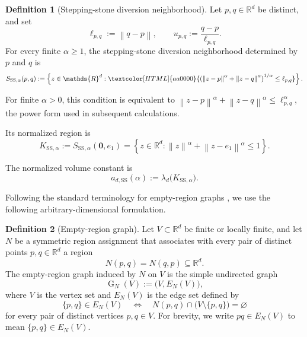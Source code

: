 \documentclass[a4paper,fleqn]{cas-dc}
\theoremstyle{definition}
\newtheorem{definition}{Definition}
\theoremstyle{remark}
\newcommand{\R}{\mathds{R}}
\newcommand{\norm}[1]{\left\lVert #1\right\rVert}
\newcommand{\set}[1]{\left\{#1\right\}}
\newcommand{\ellpq}{\ell_{p,q}}
\newcommand{\upq}{u_{p,q}}
\newcommand{\0}{\mathbf{0}}
\newcommand{\tr}[1]{\textcolor[HTML]{aa0000}{#1}}
\DeclareMathOperator{\G}{G}
\begin{document}
\begin{definition}[Stepping-stone diversion neighborhood]
Let $p,q\in\R^d$ be distinct, and set
\begin{equation}
    \ellpq:=\norm{q-p},
    \qquad
    \upq:=\frac{q-p}{\ellpq}.
\end{equation}
\tr{For every finite $\alpha\geq1$,} the stepping-stone diversion
neighborhood determined by $p$ and $q$ is
\begin{equation}\label{eq:ss-region}
    S_{\mathrm{SS},\alpha}(p,q)
    :=
    \set{
        z\in\R^d:
        \tr{\left(
        \norm{z-p}^{\alpha}+\norm{z-q}^{\alpha}
        \right)^{1/\alpha}\leq\ellpq}
    }.
\end{equation}


\tr{For finite $\alpha>0$, this condition is equivalent to
$\norm{z-p}^{\alpha}+\norm{z-q}^{\alpha}\leq\ellpq^\alpha$,
the power form used in subsequent calculations.}

Its normalized region is
\begin{equation}\label{eq:unit-region}
    K_{\mathrm{SS},\alpha}
    :=
    S_{\mathrm{SS},\alpha}(\0,e_1)
    =
    \set{
        z\in\R^d:
        \norm{z}^{\alpha}
        +
        \norm{z-e_1}^{\alpha}
        \leq1
    }.
\end{equation}
\end{definition}


The normalized volume constant is
\begin{equation}
    a_{d,\mathrm{SS}}(\alpha)
    :=
    \lambda_d\bigl(K_{\mathrm{SS},\alpha}\bigr).
\end{equation}


Following the standard terminology for empty-region graphs
\citep{devroye1988expected,cardinal2009empty}, we use the following
arbitrary-dimensional formulation.

\begin{definition}[Empty-region graph]
Let $V\subset\R^d$ be finite or locally finite, and let $N$ be a symmetric
region assignment that associates with every pair of distinct points
$p,q\in\R^d$ a region
\begin{equation}
N(p,q)=N(q,p)\subseteq\R^d.
\end{equation}
The empty-region graph induced by $N$ on $V$ is the simple undirected graph
\begin{equation}
\G_N(V):=\bigl(V,E_N(V)\bigr),
\end{equation}
where $V$ is the vertex set and $E_N(V)$ is the edge set defined by
\begin{equation}
\{p,q\}\in E_N(V)
\quad\Longleftrightarrow\quad
N(p,q)\cap\bigl(V\setminus\{p,q\}\bigr)=\varnothing
\end{equation}
for every pair of distinct vertices $p,q\in V$. For brevity, we write
$ pq\in E_N(V)$ to mean $\{p,q\}\in E_N(V)$.
\end{definition}
\end{document}
